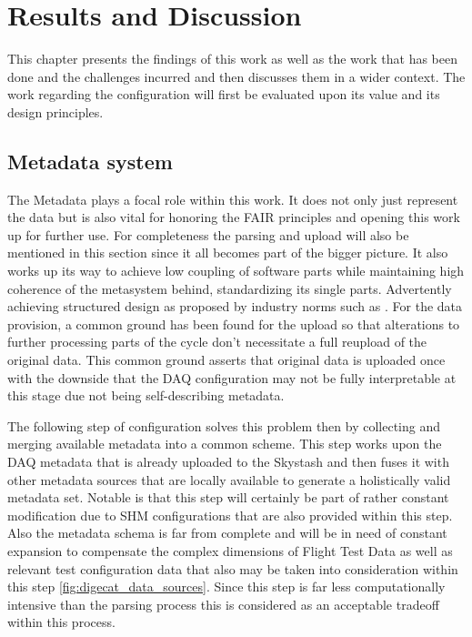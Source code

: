 \chapter{Results and Discussion}

This chapter presents the findings of this work as well as the work that has been done and the challenges incurred and then discusses them in a wider context. The work regarding the configuration will first be evaluated upon its value and its design principles.








\section{Metadata system}

The Metadata plays a focal role within this work. It does not only just represent the data but is also vital for honoring the FAIR principles and opening this work up for further use. For completeness the parsing and upload will also be mentioned in this section since it all becomes part of the bigger picture. It also works up its way to achieve low coupling of software parts while maintaining high coherence of the metasystem behind, standardizing its single parts. Advertently achieving structured design as proposed by industry norms such as \textcite{stevens_structured_1974}.
For the data provision, a common ground has been found for the upload so that alterations to further processing parts of the cycle don't necessitate a full reupload of the original data. This common ground asserts that original data is uploaded once with the downside that the DAQ configuration may not be fully interpretable at this stage due not being self-describing metadata.

The following step of configuration solves this problem then by collecting and merging available metadata into a common scheme. This step works upon the DAQ metadata that is already uploaded to the Skystash and then fuses it with other metadata sources that are locally available to generate a holistically valid metadata set. Notable is that this step will certainly be part of rather constant modification due to SHM configurations that are also provided within this step. Also the metadata schema is far from complete and will be in need of constant expansion to compensate the complex dimensions of Flight Test Data as well as relevant test configuration data that also may be taken into consideration within this step \ref{fig:digecat_data_sources}. Since this step is far less computationally intensive than the parsing process this is considered as an acceptable tradeoff within this process.

